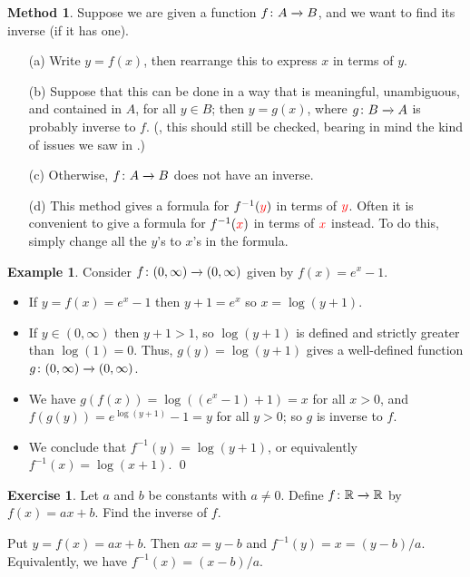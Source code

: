 \documentclass[a4paper]{book}
\theoremstyle{definition}
\newtheorem{example}[theorem]{Example}
\newtheorem{exercise}[theorem]{Exercise}
\newtheorem{method}[theorem]{Method}
\renewenvironment{solution}{\SolutionInline}{\endSolutionInline}
\begin{document}
\begin{method}
 Suppose we are given a function $f\colon A\xrightarrow{}B$, and we want to find
 its inverse (if it has one).
 \begin{itemize}
  \item[(a)] Write $y=f(x)$, then rearrange this to express $x$ in terms of
   $y$.
  \item[(b)] Suppose that this can be done in a way that is
   meaningful, unambiguous, and contained in $A$, for all $y\in B$;
   then $y=g(x)$, where $g\colon B\xrightarrow{}A$ is probably inverse to $f$.
   (, this should still be checked, bearing in mind the
   kind of issues we saw in .)
  \item[(c)] Otherwise, $f\colon A\xrightarrow{}B$ does not have an inverse.
  \item[(d)] This method gives a formula for $f^{-1}({\color{red}y})$ in terms of
   ${\color{red}y}$.  Often it is convenient to give a formula for
   $f^{-1}({\color{red}x})$ in terms of ${\color{red}x}$ instead.  To do this,
   simply change all the $y$'s to $x$'s in the formula.
 \end{itemize}
\end{method}
\begin{example}
 Consider $f\colon(0,\infty)\xrightarrow{}(0,\infty)$ given by $f(x)=e^x-1$.
 \begin{itemize}
  \item  If $y=f(x)=e^x-1$ then $y+1=e^x$ so $x=\log(y+1)$.
  \item If $y\in(0,\infty)$ then $y+1>1$, so $\log(y+1)$ is defined
   and strictly greater than $\log(1)=0$.  Thus, $g(y)=\log(y+1)$
   gives a well-defined function $g\colon(0,\infty)\xrightarrow{}(0,\infty)$.
  \item We have $g(f(x))=\log((e^x-1)+1)=x$ for all $x>0$, and
   $f(g(y))=e^{\log(y+1)}-1=y$ for all $y>0$; so $g$ is inverse to
   $f$.
  \item We conclude that $f^{-1}(y)=\log(y+1)$, or equivalently
   $f^{-1}(x)=\log(x+1)$.  \qed
 \end{itemize}
\end{example}

\begin{exercise}
 Let $a$ and $b$ be constants with $a\neq 0$.  Define $f\colon{\mathbb{R}}\xrightarrow{}{\mathbb{R}}$
 by $f(x)=ax+b$.  Find the inverse of $f$.
\end{exercise}
\begin{solution}
 Put $y=f(x)=ax+b$.  Then $ax=y-b$ and $f^{-1}(y)=x=(y-b)/a$.
 Equivalently, we have $f^{-1}(x)=(x-b)/a$.
\end{solution}
\end{document}
